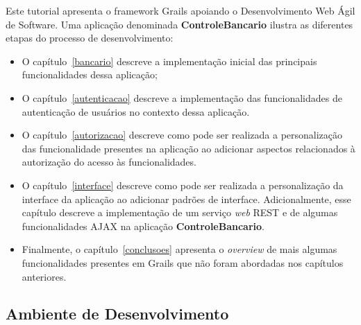 {\newpage

Este tutorial apresenta  o framework Grails apoiando o  Desenvolvimento Web Ágil
de  Software.  Uma  aplicação   denominada  {\bf  ControleBancario}  ilustra  as
diferentes etapas do processo de desenvolvimento:

\begin{itemize}

\vspace{0.3cm}

\item O capítulo~\ref{bancario} descreve  a implementação inicial das principais
  funcionalidades dessa aplicação; 

\vspace{0.3cm}

\item O capítulo~\ref{autenticacao} descreve a implementação das funcionalidades
  de autenticação de usuários no contexto dessa aplicação.  

\vspace{0.3cm}

\item  O   capítulo~\ref{autorizacao}  descreve   como  pode  ser   realizada  a
  personalização das funcionalidade presentes na aplicação ao adicionar aspectos
  relacionados à autorização do acesso às funcionalidades. 

\vspace{0.3cm}

\item   O  capítulo~\ref{interface}   descreve   como  pode   ser  realizada   a
  personalização   da   interface  da   aplicação   ao   adicionar  padrões   de
  interface.  Adicionalmente,  esse  capítulo  descreve a  implementação  de  um
  serviço {\it  web} REST  e de algumas  funcionalidades AJAX na  aplicação {\bf
    ControleBancario}.  

\vspace{0.3cm}
  
\item Finalmente, o capítulo~\ref{conclusoes} apresenta o {\it overview} de mais
  algumas  funcionalidades  presentes em  Grails  que  não  foram abordadas  nos
  capítulos anteriores.
 
\end{itemize}

\subsection{Ambiente de Desenvolvimento}

}
